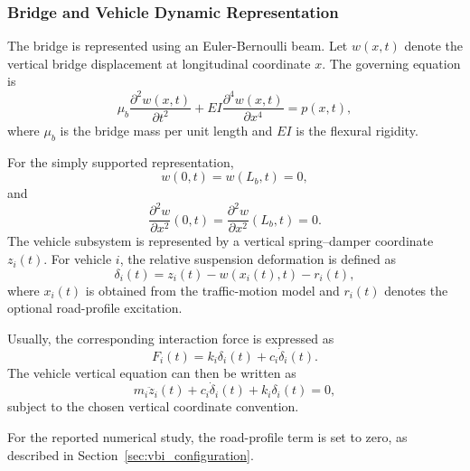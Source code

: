 \documentclass[journal]{IEEEtran}
\begin{document}
\subsubsection{Bridge and Vehicle Dynamic Representation}

The bridge is represented using an Euler-Bernoulli beam. Let $w(x,t)$ denote the vertical bridge displacement at longitudinal coordinate $x$. The governing equation is
\begin{equation}
\mu_b\frac{\partial^2 w(x,t)}{\partial t^2}+EI\frac{\partial^4 w(x,t)}{\partial x^4}=p(x,t),
\end{equation}
where $\mu_b$ is the bridge mass per unit length and $EI$ is the flexural rigidity.

For the simply supported representation,
\begin{equation}
w(0,t)=w(L_b,t)=0,
\end{equation}
and
\begin{equation}
\frac{\partial^2 w}{\partial x^2}(0,t)=\frac{\partial^2 w}{\partial x^2}(L_b,t)=0.
\end{equation}
The vehicle subsystem is represented by a vertical spring--damper coordinate $z_i(t)$. For vehicle $i$, the relative suspension deformation is defined as
\begin{equation}
\delta_i(t)=z_i(t)-w\!\left(x_i(t),t\right)-r_i(t),
\end{equation}
where $x_i(t)$ is obtained from the traffic-motion model and $r_i(t)$ denotes the optional road-profile excitation.

Usually, the corresponding interaction force is expressed as
\begin{equation}
F_i(t)=k_i\delta_i(t)+c_i\dot{\delta}_i(t).
\end{equation}
The vehicle vertical equation can then be written as
\begin{equation}
m_i\ddot{z}_i(t)+c_i\dot{\delta}_i(t)+k_i\delta_i(t)=0,
\end{equation}
subject to the chosen vertical coordinate convention.

For the reported numerical study, the road-profile term is set to zero, as described in Section~\ref{sec:vbi_configuration}.

\end{document}
